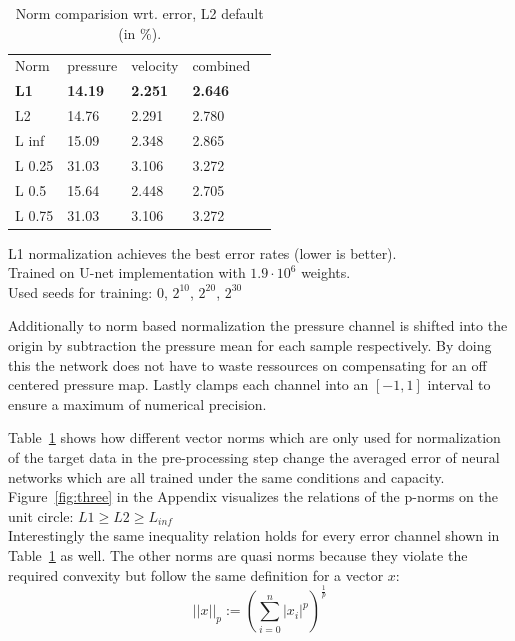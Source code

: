 \documentclass[acmtog]{techreportacmart}
\begin{document}
\begin{table}
\caption{Norm comparision wrt. error, L2 default (in \%).}
\label{tab:one}
\begin{center}
\begin{tabular}{l|l|l|l|l}
  \toprule
  Norm   & pressure   &	velocity    & combined \\
  \bf L1	 & \bf 14.19	  & \bf 2.251		& \bf 2.646    \\
  L2	 & 14.76	  & 2.291		& 2.780	   \\
  L inf	 & 15.09	  & 2.348		& 2.865	   \\
  L 0.25 & 31.03	  & 3.106		& 3.272	   \\
  L 0.5  & 15.64	  & 2.448		& 2.705	   \\
  L 0.75 & 31.03	  & 3.106		& 3.272	   \\	
  \bottomrule
\end{tabular}
\end{center}
\bigskip\centering
\footnotesize L1 normalization achieves the best error rates (lower is better). \\
Trained on \cite{Thuerey20} U-net implementation with $1.9 \cdot 10^{6}$ weights. \\
Used seeds for training: $0$, $2^{10}$, $2^{20}$, $2^{30}$
\end{table}%
Additionally to norm based normalization the pressure channel is shifted into the origin by subtraction the pressure mean for each sample respectively. By doing this the network does not have to waste ressources on compensating for an off centered pressure map. Lastly \cite{Thuerey20} clamps each channel into an $[-1, 1]$ interval to ensure a maximum of numerical precision.



Table~\ref{tab:one} shows how different vector norms which are only used for normalization of the target data in the pre-processing step change the averaged error of neural networks which are all trained under the same conditions and capacity. Figure~\ref{fig:three} in the Appendix visualizes the relations of the p-norms on the unit circle: $L1 \geq L2 \geq L_{inf}$\\
Interestingly the same inequality relation holds for every error channel shown in Table~\ref{tab:one} as well. The other norms are quasi norms because they violate the required convexity but follow the same definition for a vector $x$:
\begin{equation}
\label{eqn:01}
||x||_p := {\left( \sum_{i=0}^{n} |x_i|^p \right)}^{\frac{1}{p}}
\end{equation}
\end{document}
